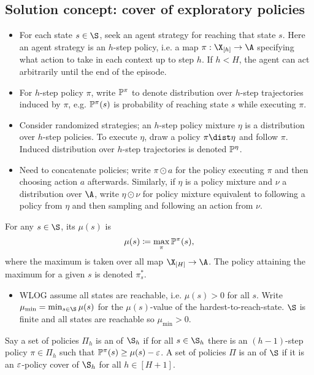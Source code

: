 \documentclass[11pt, openany]{book}
\begin{document}
\subsection{Solution concept: cover of exploratory policies}
\begin{itemize}
    \item For each state $s\in\S$, seek an agent strategy for reaching that state $s$. Here an agent strategy is an $h$-step policy, i.e. a map $\pi:\X_{[h]}\to\A$ specifying what action to take in each context up to step $h$. If $h<H$, the agent can act arbitrarily until the end of the episode.
    \item For $h$-step policy $\pi$, write $\P^\pi$ to denote distribution over $h$-step trajectories induced by $\pi$, e.g. $\P^\pi(s)$ is probability of reaching state $s$ while executing $\pi$.
    \item Consider randomized strategies; an $h$-step policy mixture $\eta$ is a distribution over $h$-step policies. To execute $\eta$, draw a policy $\pi\dist\eta$ and follow $\pi$. Induced distribution over $h$-step trajectories is denoted $\P^\eta$.
    \item Need to concatenate policies; write $\pi\odot a$ for the policy executing $\pi$ and then choosing action $a$ afterwards. Similarly, if $\eta$ is a policy mixture and $\nu$ a distribution over $\A$, write $\eta\odot\nu$ for policy mixture equivalent to following a policy from $\eta$ and then sampling and following an action from $\nu$.
\end{itemize}

\begin{definition}
    For any $s\in\S$, its  $\mu(s)$ is
    \[
        \mu(s)\defeq \max_\pi \P^\pi(s),
    \]
    where the maximum is taken over all map $\X_{[H]}\to\A$. The policy attaining the maximum for a given $s$ is denoted $\pi_s^*$.
\end{definition}

\begin{itemize}
    \item WLOG assume all states are reachable, i.e. $\mu(s)>0$ for all $s$. Write $\mu_{\min} = \min_{s\in\S} \mu(s)$ for the $\mu(s)$-value of the hardest-to-reach-state. $\S$ is finite and all states are reachable so $\mu_{\min} > 0$.
\end{itemize}

\begin{definition}
    Say a set of policies $\Pi_h$ is an  of $\S_h$ if for all $s\in\S_h$ there is an $(h-1)$-step policy $\pi\in\Pi_h$ such that $\P^\pi(s)\geq\mu(s)-\eps$. A set of policies $\Pi$ is an  of $\S$ if it is an $\eps$-policy cover of $\S_h$ for all $h\in [H+1]$. 
\end{definition}
\end{document}
